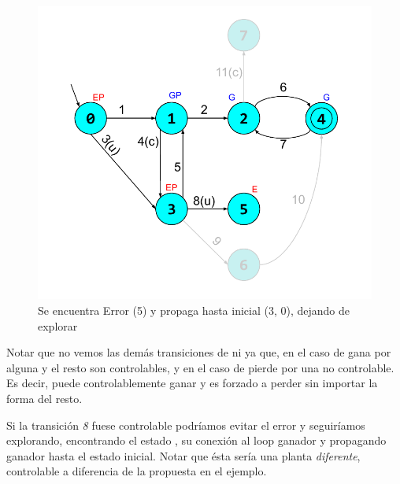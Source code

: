 \begin{figure}
 \centering
 \includegraphics[scale=0.6]{figures/ejemplo_on-the-fly/4.pdf}
 \caption{Se encuentra Error (5) y propaga hasta inicial (3, 0), dejando de explorar}
 \label{fig:ej:exploracion4}
\end{figure}

Notar que no vemos las demás transiciones de  ni  ya que, en el caso de  gana por alguna y el resto son controlables, y en el caso de  pierde por una no controlable. Es decir,  puede controlablemente ganar y  es forzado a perder sin importar la forma del resto.

Si la transición \textit{8} fuese controlable podríamos evitar el error y seguiríamos explorando, encontrando el estado , su conexión al loop ganador y propagando ganador hasta el estado inicial. Notar que ésta sería una planta \textit{diferente}, controlable a diferencia de la propuesta en el ejemplo.















